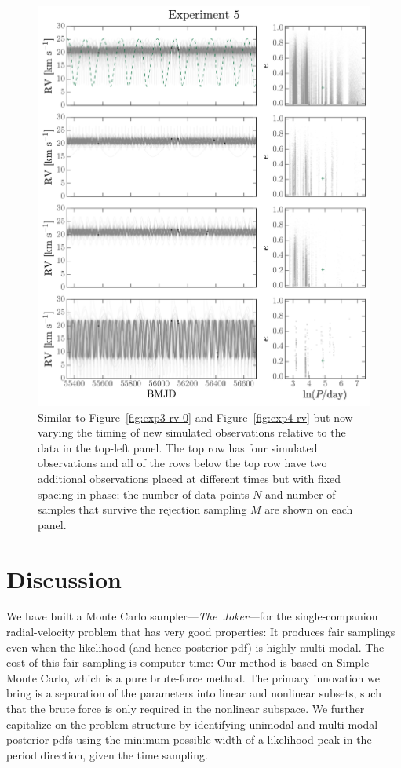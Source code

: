 \documentclass[manuscript, letterpaper]{aastex6}
\newcommand{\project}[1]{\textsl{#1}}
\newcommand{\samplername}{\project{The~Joker}}
\newcommand{\figname}{Figure}
\begin{document}
\begin{figure}[p]
\begin{center}
\includegraphics[width=\textwidth]{figures/exp5-rv-curves.pdf}
\end{center}
\caption{%
Similar to \figname~\ref{fig:exp3-rv-0} and \figname~\ref{fig:exp4-rv} but now
varying the timing of new simulated observations relative to the data in the
top-left panel.
The top row has four simulated observations and all of the rows below the top
row have two additional observations placed at different times but with fixed
spacing in phase; the number of data points $N$ and number of samples that
survive the rejection sampling $M$ are shown on each panel.
\label{fig:exp5-rv}}
\end{figure}

\section{Discussion} \label{sec:discussion}

We have built a Monte Carlo sampler---\samplername---for the
single-companion radial-velocity problem that has very good
properties:
It produces fair samplings even when the likelihood (and hence
posterior pdf) is highly multi-modal.
The cost of this fair sampling is computer time:
Our method is based on Simple Monte Carlo, which is a pure brute-force
method.
The primary innovation we bring is a separation of the parameters
into linear and nonlinear subsets, such that the brute force is only
required in the nonlinear subspace.
We further capitalize on the problem structure by identifying unimodal
and multi-modal posterior pdfs using the minimum possible width of a
likelihood peak in the period direction, given the time sampling.
\end{document}
